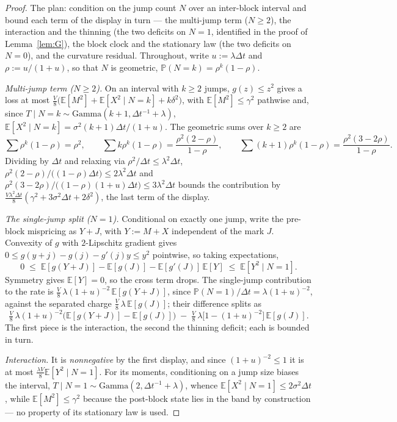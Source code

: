 \documentclass[runningheads]{llncs}
\newcommand{\E}{\mathbb{E}}
\newcommand{\Prob}{\mathbb{P}}
\newcommand{\dt}{\Delta t}
\newcommand{\1}{\mathbf{1}}
\begin{document}
\begin{proof}
The plan: condition on the jump count $N$ over an inter-block interval and bound each term of the display in turn --- the multi-jump term ($N\ge2$), the interaction and the thinning (the two deficits on $N=1$, identified in the proof of Lemma~\ref{lem:G}), the block clock and the stationary law (the two deficits on $N=0$), and the curvature residual. Throughout, write $u:=\lambda\dt$ and $\rho:=u/(1+u)$, so that $N$ is geometric, $\Prob(N{=}k)=\rho^k(1-\rho)$.

\emph{Multi-jump term ($N\ge2$).} On an interval with $k\ge2$ jumps, $g(z)\le z^2$ gives a loss at most $\tfrac{V}{8}\big(\E[M^2]+\E[X^2\mid N{=}k]+k\delta^2\big)$, with $\E[M^2]\le\gamma^2$ pathwise and, since $T\mid N{=}k\sim\mathrm{Gamma}(k{+}1,\dt^{-1}{+}\lambda)$, $\E[X^2\mid N{=}k]=\sigma^2(k{+}1)\dt/(1+u)$. The geometric sums over $k\ge2$ are
\[
\textstyle\sum\rho^k(1-\rho)=\rho^2, \qquad
\textstyle\sum k\rho^k(1-\rho)=\frac{\rho^2(2-\rho)}{1-\rho}, \qquad
\textstyle\sum (k{+}1)\rho^k(1-\rho)=\frac{\rho^2(3-2\rho)}{1-\rho}.
\]
Dividing by $\dt$ and relaxing via $\rho^2/\dt\le\lambda^2\dt$, $\rho^2(2-\rho)/\big((1-\rho)\dt\big)\le2\lambda^2\dt$ and $\rho^2(3-2\rho)/\big((1-\rho)(1+u)\dt\big)\le3\lambda^2\dt$ bounds the contribution by $\tfrac{V\lambda^2\dt}{8}(\gamma^2+3\sigma^2\dt+2\delta^2)$, the last term of the display.

\emph{The single-jump split ($N=1$).} Conditional on exactly one jump, write the pre-block mispricing as $Y+J$, with $Y := M+X$ independent of the mark $J$. Convexity of $g$ with $2$-Lipschitz gradient gives $0\le g(y+j)-g(j)-g'(j)y\le y^2$ pointwise, so taking expectations,
\[
0 \;\le\; \E[g(Y+J)]-\E[g(J)] - \E[g'(J)]\,\E[Y] \;\le\; \E[Y^2\mid N{=}1].
\]
Symmetry gives $\E[Y]=0$, so the cross term drops. The single-jump contribution to the rate is $\tfrac{V}{8}\,\lambda(1+u)^{-2}\,\E[g(Y+J)]$, since $\Prob(N{=}1)/\dt=\lambda(1+u)^{-2}$, against the separated charge $\tfrac{V}{8}\,\lambda\,\E[g(J)]$; their difference splits as
\[
\tfrac{V}{8}\,\lambda(1+u)^{-2}\big(\E[g(Y{+}J)]-\E[g(J)]\big) \;-\; \tfrac{V}{8}\,\lambda\big[1-(1+u)^{-2}\big]\,\E[g(J)].
\]
The first piece is the interaction, the second the thinning deficit; each is bounded in turn.

\emph{Interaction.} It is \emph{nonnegative} by the first display, and since $(1+u)^{-2}\le1$ it is at most $\tfrac{\lambda V}{8}\E[Y^2\mid N{=}1]$. For its moments, conditioning on a jump size biases the interval, $T\mid N{=}1\sim\mathrm{Gamma}(2,\dt^{-1}+\lambda)$, whence $\E[X^2\mid N{=}1]\le2\sigma^2\dt$, while $\E[M^2]\le\gamma^2$ because the post-block state lies in the band by construction --- no property of its stationary law is used.


\end{proof}
\end{document}
